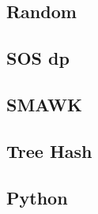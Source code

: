 \subsection{Random}

\subsection{SOS dp}

\subsection{SMAWK}

\subsection{Tree Hash}

\subsection{Python}


